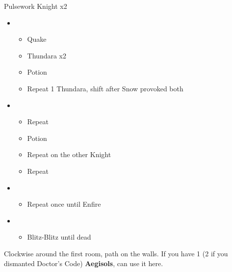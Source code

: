 	\begin{battle}[0:37]{Pulsework Knight x2}
		\begin{itemize}
			\item \first
			      \begin{itemize}
				      \item Quake
				      \item Thundara x2
				      \item Potion
				      \item Repeat 1 Thundara, shift after Snow provoked both
			      \end{itemize}
			\item \second
			      \begin{itemize}
				      \item Repeat
				      \item Potion
				      \item Repeat on the other Knight
				      \item Repeat
			      \end{itemize}
			\item \third
			      \begin{itemize}
				      \item Repeat once until Enfire
			      \end{itemize}
			\item \fifth
			      \begin{itemize}
				      \item Blitz-Blitz until dead
			      \end{itemize}
		\end{itemize}
	\end{battle}
	Clockwise around the first room, path on the walls.
	If you have 1 (2 if you dismanted Doctor's Code) \textbf{Aegisols}, can use it here.
	\vfill
	\renewcommand{\first}{[1] Riot Shield (\rav/\sen/\syn)}
	\renewcommand{\second}{[2] Tri-Disaster (\rav/\rav/\rav)}
	\renewcommand{\third}{[3] Malevolence (\rav/\rav/\syn)}
	\renewcommand{\fourth}{[4] Tri-Disaster (\rav/\rav/\rav)}
	\renewcommand{\fifth}{[5] Aggression (\com/\com/\rav)}
